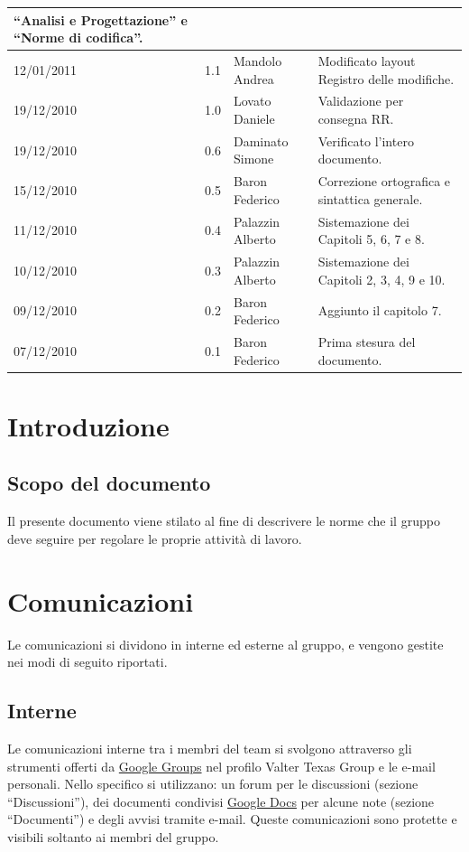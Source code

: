 \begin{longtable}{|p{}|c|p{}|p{}|}
``Analisi e Progettazione'' e ``Norme di codifica''.\\
\hline
12/01/2011 & 1.1 & Mandolo Andrea & Modificato layout Registro delle
modifiche.\\
\hline
19/12/2010 & 1.0 & Lovato Daniele & Validazione per consegna RR.\\
\hline
19/12/2010 & 0.6 & Daminato Simone & Verificato l'intero documento.\\
\hline
15/12/2010 & 0.5 & Baron Federico & Correzione ortografica e sintattica
generale.\\
\hline
11/12/2010 & 0.4 & Palazzin Alberto & Sistemazione dei Capitoli 5, 6, 7 e 8.\\
\hline
10/12/2010 & 0.3 & Palazzin Alberto & Sistemazione dei Capitoli 2, 3, 4, 9 e
10.\\
\hline
09/12/2010 & 0.2 & Baron Federico & Aggiunto il capitolo 7.\\
\hline
 07/12/2010 & 0.1 & Baron Federico & Prima stesura del documento.
\end{longtable}


\tableofcontents

\chapter{Introduzione}
\thispagestyle{fancy} %

\section{Scopo del documento}
Il presente documento viene stilato al fine di descrivere le norme che il gruppo
deve seguire per regolare le proprie attivit\`a di lavoro.



\chapter{Comunicazioni}
\thispagestyle{fancy}
Le comunicazioni si dividono in interne ed esterne al gruppo, e vengono gestite
nei modi di seguito riportati.

\section{Interne}
Le comunicazioni interne tra i membri del team si svolgono attraverso gli
strumenti offerti da \underline{Google Groups} nel profilo Valter Texas Group e
le e-mail personali. Nello specifico si utilizzano: un forum per le discussioni
(sezione ``Discussioni''), dei documenti condivisi \underline{Google Docs} per
alcune note (sezione ``Documenti'') e degli avvisi tramite e-mail. 
Queste comunicazioni sono protette e visibili soltanto ai membri del gruppo.


